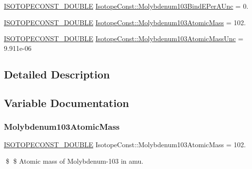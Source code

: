 \begin{DoxyCompactItemize}
\mbox{\hyperlink{group___isotope_const-_macros_ga8f45a7272ce02c0b4c65c44636ed719a}{I\+S\+O\+T\+O\+P\+E\+C\+O\+N\+S\+T\+\_\+\+D\+O\+U\+B\+LE}} \mbox{\hyperlink{group___isotope_const-_molybdenum-_mo103_gaed92af3d2b6f66f7c15deddd97dd6ea6}{Isotope\+Const\+::\+Molybdenum103\+Bind\+E\+Per\+A\+Unc}} = 0.
\item 
\mbox{\hyperlink{group___isotope_const-_macros_ga8f45a7272ce02c0b4c65c44636ed719a}{I\+S\+O\+T\+O\+P\+E\+C\+O\+N\+S\+T\+\_\+\+D\+O\+U\+B\+LE}} \mbox{\hyperlink{group___isotope_const-_molybdenum-_mo103_gacab7e23b134af8331aa2aa564e93df66}{Isotope\+Const\+::\+Molybdenum103\+Atomic\+Mass}} = 102.
\item 
\mbox{\hyperlink{group___isotope_const-_macros_ga8f45a7272ce02c0b4c65c44636ed719a}{I\+S\+O\+T\+O\+P\+E\+C\+O\+N\+S\+T\+\_\+\+D\+O\+U\+B\+LE}} \mbox{\hyperlink{group___isotope_const-_molybdenum-_mo103_ga04772abe90cad91605f974e200d152b8}{Isotope\+Const\+::\+Molybdenum103\+Atomic\+Mass\+Unc}} = 9.\+911e-\/06
\end{DoxyCompactItemize}


\subsection{Detailed Description}


\subsection{Variable Documentation}
\mbox{\label{group___isotope_const-_molybdenum-_mo103_gacab7e23b134af8331aa2aa564e93df66}} 
\subsubsection{\texorpdfstring{Molybdenum103\+Atomic\+Mass}{Molybdenum103AtomicMass}}
{\footnotesize\ttfamily \mbox{\hyperlink{group___isotope_const-_macros_ga8f45a7272ce02c0b4c65c44636ed719a}{I\+S\+O\+T\+O\+P\+E\+C\+O\+N\+S\+T\+\_\+\+D\+O\+U\+B\+LE}} Isotope\+Const\+::\+Molybdenum103\+Atomic\+Mass = 102.}

\$ \$ Atomic mass of Molybdenum-\/103 in amu. \mbox{\label{group___isotope_const-_molybdenum-_mo103_ga04772abe90cad91605f974e200d152b8}} 
